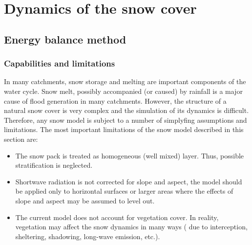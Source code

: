 \chapter{Dynamics of the snow cover} \label{chap:snow}
\renewcommand{\tabdir}{chapters/part_processes/snow/tab}
\renewcommand{\figdir}{chapters/part_processes/snow/fig}


\section{Energy balance method} \label{sec:snow-enBal}


\subsection{Capabilities and limitations} \label{sec:snow-enBal_caps-lims}

In many catchments, snow storage and melting are important components of the water cycle. Snow melt, possibly accompanied (or caused) by rainfall is a major cause of flood generation in many catchments. However, the structure of a natural snow cover is very complex and the simulation of its dynamics is difficult. Therefore, any snow model is subject to a number of simplyfing assumptions and limitations. The most important limitations of the snow model described in this section are:

\begin{itemize}
  \item The snow pack is treated as homogeneous (well mixed) layer. Thus, possible stratification is neglected.
  \item Shortwave radiation is not corrected for slope and aspect, \ie{} the model should be applied only to horizontal surfaces or larger areas where the effects of slope and aspect may be assumed to level out.
  \item The current model does not account for vegetation cover. In reality, vegetation may affect the snow dynamics in many ways (\eg{} due to interception, sheltering, shadowing, long-wave emission, etc.).
\end{itemize}

